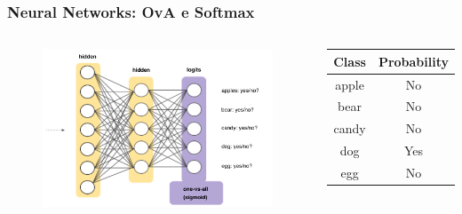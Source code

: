 \begin{frame}

	\frametitle{Neural Networks: OvA e Softmax}

	\begin{columns}
		\begin{figure}[!htbp]
			\centering
			\includegraphics[width=1.0\linewidth]{images/supervised/z_algorithms_neural_networks/OneVsAll.pdf}
		\end{figure}

		\begin{scriptsize}
			\begin{table}[]
				\begin{tabular}{|c|c|}
				\hline
				\rowcolor{gray!50} \textbf{Class} & \textbf{Probability}\\ \hline
				apple & No\\ \hline
				bear & No\\ \hline
				candy & No\\ \hline
				dog & Yes\\ \hline
				egg & No\\ \hline
				\end{tabular}
			\end{table}
		\end{scriptsize}



\end{columns}
\end{frame}
